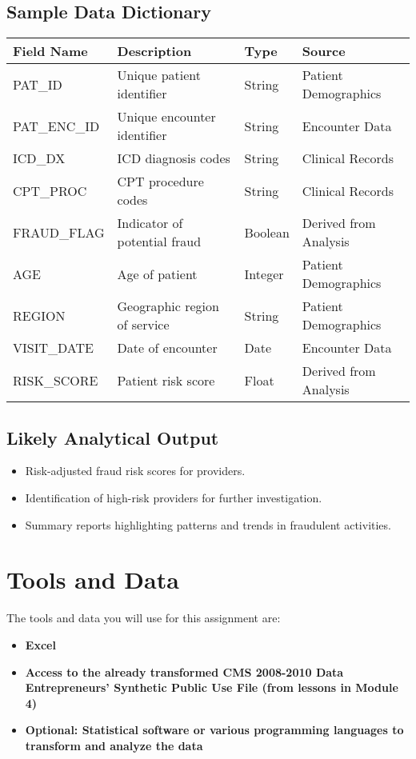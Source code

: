 \documentclass{article}
\begin{document}
\subsection*{Sample Data Dictionary}
\begin{longtable}{|l|p{3.5in}|l|l|}
\hline
\textbf{Field Name} & \textbf{Description} & \textbf{Type} & \textbf{Source} \\
\hline
PAT\_ID & Unique patient identifier & String & Patient Demographics \\
\hline
PAT\_ENC\_ID & Unique encounter identifier & String & Encounter Data \\
\hline
ICD\_DX & ICD diagnosis codes & String & Clinical Records \\
\hline
CPT\_PROC & CPT procedure codes & String & Clinical Records \\
\hline
FRAUD\_FLAG & Indicator of potential fraud & Boolean & Derived from Analysis \\
\hline
AGE & Age of patient & Integer & Patient Demographics \\
\hline
REGION & Geographic region of service & String & Patient Demographics \\
\hline
VISIT\_DATE & Date of encounter & Date & Encounter Data \\
\hline
RISK\_SCORE & Patient risk score & Float & Derived from Analysis \\
\hline
\end{longtable}

\subsection*{Likely Analytical Output}
\begin{itemize}
    \item Risk-adjusted fraud risk scores for providers.
    \item Identification of high-risk providers for further investigation.
    \item Summary reports highlighting patterns and trends in fraudulent activities.
\end{itemize}

\section*{Tools and Data}
The tools and data you will use for this assignment are:
\begin{itemize}
    \item \textbf{Excel}
    \item \textbf{Access to the already transformed CMS 2008-2010 Data Entrepreneurs’ Synthetic Public Use File (from lessons in Module 4)}
    \item \textbf{Optional: Statistical software or various programming languages to transform and analyze the data}
\end{itemize}
\end{document}
